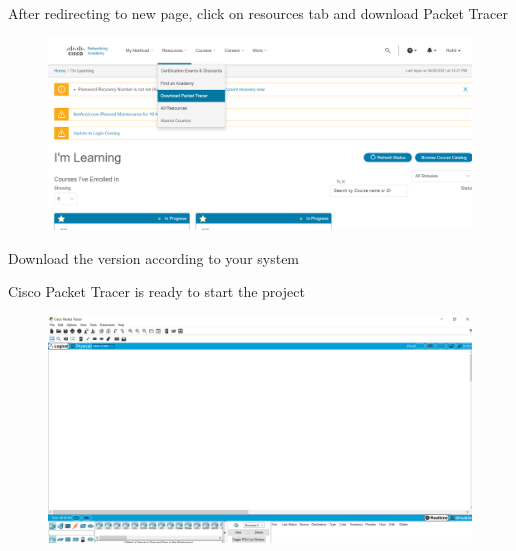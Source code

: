 \documentclass[12pt,a4paper]{article}
\begin{document}
\begin{steps}
\item After redirecting to new page, click on resources tab and download Packet Tracer
\begin{figure}[h]
 		\centering
				\includegraphics[scale=0.19]{2.8.png}	
	\end{figure}
\item Download the version according to your system
\pagebreak
\item Cisco Packet Tracer is ready to start the project
\begin{figure}[h]
 		\centering
				\includegraphics[scale=0.19]{2.10.png}	
	\end{figure}
\end{steps}
\end{document}

